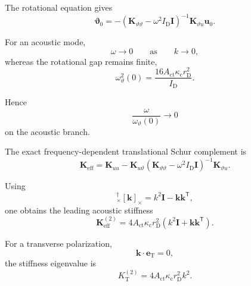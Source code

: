 The rotational equation gives
\begin{equation}
    \boldsymbol{\vartheta}_0
    =
    -
    \left(
        \mathbf{K}_{\vartheta\vartheta}
        -
        \omega^2I_{\mathrm{D}}\mathbf{I}
    \right)^{-1}
    \mathbf{K}_{\vartheta u}
    \mathbf{u}_0.
\end{equation}

For an acoustic mode,
\begin{equation}
    \omega\rightarrow0
    \qquad
    \text{as}
    \qquad
    k\rightarrow0,
\end{equation}
whereas the rotational gap remains finite,
\begin{equation}
    \omega_{\vartheta}^2(0)
    =
    \frac{
        16A_{\mathrm{ct}}\kappa_{\mathrm{c}}r_{\mathrm{D}}^2
    }{
        I_{\mathrm{D}}
    }.
\end{equation}

Hence
\begin{equation}
    \frac{\omega}{\omega_{\vartheta}(0)}
    \rightarrow0
\end{equation}
on the acoustic branch.

The exact frequency-dependent translational Schur complement is
\begin{equation}
    \mathbf{K}_{\mathrm{eff}}
    =
    \mathbf{K}_{uu}
    -
    \mathbf{K}_{u\vartheta}
    \left(
        \mathbf{K}_{\vartheta\vartheta}
        -
        \omega^2I_{\mathrm{D}}\mathbf{I}
    \right)^{-1}
    \mathbf{K}_{\vartheta u}.
\end{equation}

Using
\begin{equation}
    [\mathbf{k}]_{\times}^{\dagger}
    [\mathbf{k}]_{\times}
    =
    k^2\mathbf{I}
    -
    \mathbf{k}\mathbf{k}^{\mathsf{T}},
\end{equation}
one obtains the leading acoustic stiffness
\begin{equation}
    \boxed{
    \mathbf{K}_{\mathrm{eff}}^{(2)}
    =
    4A_{\mathrm{ct}}\kappa_{\mathrm{c}}r_{\mathrm{D}}^2
    \left(
        k^2\mathbf{I}
        +
        \mathbf{k}\mathbf{k}^{\mathsf{T}}
    \right).
    }
\end{equation}

For a transverse polarization,
\begin{equation}
    \mathbf{k}\cdot\mathbf{e}_{\mathrm{T}}=0,
\end{equation}
the stiffness eigenvalue is
\begin{equation}
    K_{\mathrm{T}}^{(2)}
    =
    4A_{\mathrm{ct}}\kappa_{\mathrm{c}}r_{\mathrm{D}}^2k^2.
\end{equation}

